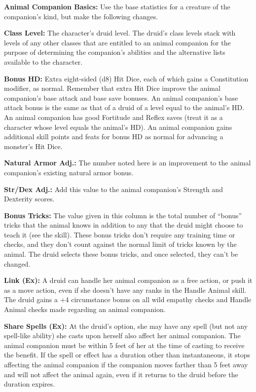 \textbf{Animal Companion Basics:} Use the base statistics for a creature of the companion's kind, but make the following changes.

\textbf{Class Level:} The character's druid level. The druid's class levels stack with levels of any other classes that are entitled to an animal companion for the purpose of determining the companion's abilities and the alternative lists available to the character.

\textbf{Bonus HD:} Extra eight-sided (d8) Hit Dice, each of which gains a Constitution modifier, as normal. Remember that extra Hit Dice improve the animal companion's base attack and base save bonuses. An animal companion's base attack bonus is the same as that of a druid of a level equal to the animal's HD. An animal companion has good Fortitude and Reflex saves (treat it as a character whose level equals the animal's HD). An animal companion gains additional skill points and feats for bonus HD as normal for advancing a monster's Hit Dice.

\textbf{Natural Armor Adj.:} The number noted here is an improvement to the animal companion's existing natural armor bonus.

\textbf{Str/Dex Adj.:} Add this value to the animal companion's Strength and Dexterity scores.

\textbf{Bonus Tricks:} The value given in this column is the total number of ``bonus'' tricks that the animal knows in addition to any that the druid might choose to teach it (see the  skill). These bonus tricks don't require any training time or  checks, and they don't count against the normal limit of tricks known by the animal. The druid selects these bonus tricks, and once selected, they can't be changed.

\textbf{Link (Ex):} A druid can handle her animal companion as a free action, or push it as a move action, even if she doesn't have any ranks in the Handle Animal skill. The druid gains a +4 circumstance bonus on all wild empathy checks and Handle Animal checks made regarding an animal companion.

\textbf{Share Spells (Ex):} At the druid's option, she may have any spell (but not any spell-like ability) she casts upon herself also affect her animal companion. The animal companion must be within 5 feet of her at the time of casting to receive the benefit. If the spell or effect has a duration other than instantaneous, it stops affecting the animal companion if the companion moves farther than 5 feet away and will not affect the animal again, even if it returns to the druid before the duration expires.

